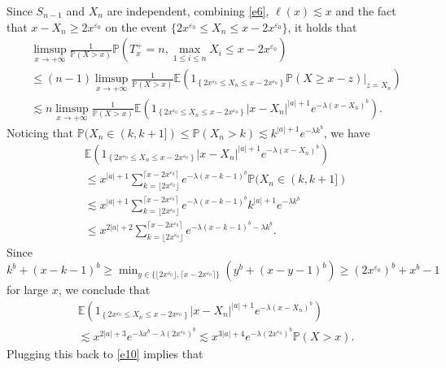 \documentclass[10pt,a4paper]{amsart}
\numberwithin{equation}{section}
\begin{document}
Since $S_{n-1}$ and $X_n$ are independent, combining \eqref{e6}, $\ell (x)\lesssim x$ and the fact that $x-X_n \geq 2x^{\varepsilon_0}$ on the event $\{2x^{\varepsilon_0}\leq X_n \leq x-2x^{\varepsilon_0}\}$,  it holds that 
\begin{align}\label{e10}
	& \limsup_{x\to+\infty} \frac{1}{\mathbb{P}(X>x)}\mathbb{P}\left(T_x^+=n, \max_{1\leq i\leq n} X_i \leq x-2x^{\varepsilon_0}\right)\nonumber\\
	& \leq (n-1) \limsup_{x\to+\infty} \frac{1}{\mathbb{P}(X>x)}\mathbb{E}\left(1_{\left\{2x^{\varepsilon_0}\leq X_n \leq x-2x^{\varepsilon_0} \right\}} \mathbb{P}(X \geq x-z)\big|_{z=X_n} \right) \nonumber\\
	&\lesssim  n \limsup_{x\to+\infty} \frac{1}{\mathbb{P}(X>x)} \mathbb{E}\left(1_{\left\{2x^{\varepsilon_0}\leq X_n \leq x-2x^{\varepsilon_0} \right\}}  |x-X_n|^{|a|+1}e^{-\lambda (x-X_n)^b} \right) .
\end{align}
Noticing that $\mathbb{P}(X_n \in (k, k+1])\leq \mathbb{P}(X_n >k)\lesssim k^{|a|+1}e^{-\lambda k^b}$, we have
\begin{align}
	&\mathbb{E}\left(1_{\left\{2x^{\varepsilon_0}\leq X_n \leq x-2x^{\varepsilon_0} \right\}}  |x-X_n|^{|a|+1}e^{-\lambda (x-X_n)^b} \right) \nonumber\\
	&\leq x^{|a|+1} \sum_{k=\lfloor 2x^{\varepsilon_0}\rfloor}^{\lceil x-2x^{\varepsilon_0}\rceil} e^{-\lambda (x-k-1)^b}\mathbb{P}(X_n\in (k, k+1]) \nonumber\\
	&\lesssim x^{|a|+1} \sum_{k=\lfloor 2x^{\varepsilon_0}\rfloor}^{\lceil x-2x^{\varepsilon_0}\rceil}   e^{-\lambda (x-k-1)^b}k^{|a|+1}e^{-\lambda k^{b}}\nonumber\\
	&\leq x^{2|a|+2} \sum_{k=\lfloor 2x^{\varepsilon_0}\rfloor}^{\lceil x-2x^{\varepsilon_0}\rceil}   e^{-\lambda (x-k-1)^b-\lambda k^{b}}.
\end{align}
Since $k^b + (x-k-1)^b\geq  \min_{y\in \{ \lfloor 2x^{\varepsilon_0}\rfloor,  \lceil x-2x^{\varepsilon_0} \rceil \}}(y^b + (x-y-1)^b) \geq (2x^{\varepsilon_0})^b +x^b-1$ for large $x$, we conclude that 
\begin{align}\label{e10-1}
&\mathbb{E}\left(1_{\left\{2x^{\varepsilon_0}\leq X_n \leq x-2x^{\varepsilon_0} \right\}}  |x-X_n|^{|a|+1}e^{-\lambda (x-X_n)^b} \right) \nonumber\\
&\lesssim x^{2|a|+3} e^{-\lambda x^b-\lambda (2x^{\varepsilon_0})^{b}} \lesssim x^{3|a|+4}e^{-\lambda (2x^{\varepsilon_0})^{b}} \mathbb{P}(X>x).
\end{align}
Plugging this back to \eqref{e10} implies that 
\end{document}
